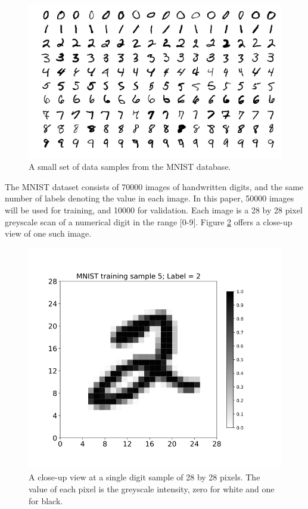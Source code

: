 \documentclass[sigplan, review=false, screen=true, balance=true]{acmart}
\begin{document}
\begin{figure}[H]
  \centering
  \includegraphics[width=\columnwidth]{../figures/mnist_examples.png}
  \caption{A small set of data samples from the MNIST database.}
  \label{fig_mnist_examples}
\end{figure}

The MNIST dataset consists of 70000 images of handwritten digits, and the
same number of labels denoting the value in each image. In this paper,
50000 images will be used for training, and 10000 for validation.
Each image is a 28 by 28 pixel greyscale scan of a 
numerical digit in the range [0-9]. Figure \ref{fig_mnist_example_digit} 
offers a close-up view of one such image.

\begin{figure}[H]
  \centering
  \includegraphics[width=\columnwidth]{../figures/mnist_example_digit.png}
  \caption{A close-up view at a single digit sample of 28 by 28 pixels.
           The value of each pixel is the greyscale intensity, zero for white
           and one for black.}
  \label{fig_mnist_example_digit}
\end{figure}
\end{document}
